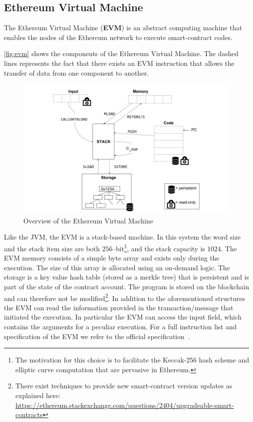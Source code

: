 \subsection{Ethereum Virtual Machine}
\label{sec:evm}
The Ethereum Virtual Machine (\textbf{EVM}) is an abstract computing machine
that enables the nodes of the Ethereum network to execute smart-contract
codes.


\autoref{fig:evm} shows the components of the Ethereum Virtual Machine.
The dashed lines represents the fact that there exists an EVM instruction
that allows the transfer of data from one component to another.
\begin{figure}
	\begin{center}
		\includegraphics[width=\textwidth]
        {./res/img/architecture/evm/EVM.png}
	\end{center}
	\caption{Overview of the Ethereum Virtual Machine}
	\label{fig:evm}
\end{figure}
Like the JVM, the EVM is a stack-based machine. In this system the word size
and the stack item size are both $256$--bit\footnote{The motivation
for this choice is to facilitate the Keccak-256 hash scheme and elliptic
curve computation that are pervasive in Ethereum.},
and the stack capacity is $1024$.
The EVM memory consists of a simple byte array and exists only during the
execution. The size of this array is allocated using an on-demand logic.
The storage is a key value hash table (stored as a merkle tree) that is
persistent and is part of the state of the contract account.
The program is stored on the blockchain and can therefore not
be modified\footnote{There exist
techniques to provide new smart-contract version updates as explained
here:
\url{https://ethereum.stackexchange.com/questions/2404/upgradeable-smart-contracts}}.
In addition to the aforementioned structures the EVM can read the information
provided in the transaction/message that initiated the execution. In particular
the EVM can access the input field, which contains the arguments for a peculiar
execution.
For a full instruction list and specification of the EVM
we refer to the official specification~\cite{wood2018ethereum}.


